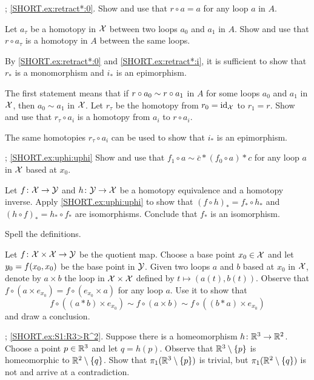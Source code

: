 \parbf{\ref{ex:retract*}}; \ref{SHORT.ex:retract*:0}.
Show and use that $r\circ a=a$ for any loop $a$ in $A$.

 Let $a_\tau$ be a homotopy in $\mathcal{X}$ between two loops $a_0$ and $a_1$ in $A$.
Show and use that $r\circ a_\tau$ is a homotopy in $A$ between the same loops.

By \ref{SHORT.ex:retract*:0} and \ref{SHORT.ex:retract*:i}, it is sufficient to show that $r_*$ is a monomorphism and $i_*$ is an epimorphism.

The first statement means that if $r\circ a_0\z\sim r\circ a_1$ in $A$ for some loops $a_0$ and $a_1$ in $\mathcal{X}$, then $a_0\sim a_1$ in $\mathcal{X}$.
Let $r_\tau$ be the homotopy from $r_0=\mathrm{id}_{\mathcal{X}}$ to $r_1=r$.
Show and use that $r_\tau\circ a_i$ is a homotopy from
$a_i$ to $r\circ a_i$.

The same homotopies $r_\tau\circ a_i$ can be used to show that $i_*$ is an epimorphism.

\parbf{\ref{ex:uphi}}; \ref{SHORT.ex:uphi:uphi} Show and use that
$f_1\circ a\sim \bar c*(f_0\circ a)*c$ for any loop $a$ in $\mathcal{X}$ based at $x_0$.

Let $f\:\c{X}\z\to\c{Y}$ and $h\:\c{Y}\z\to\c{X}$ be a homotopy equivalence and a homotopy inverse.
Apply \ref{SHORT.ex:uphi:uphi} to show that $(f\circ h)_*=f_*\circ h_*$ and $(h\circ f)_*=h_*\circ f_*$ are isomorphisms.
Conclude that $f_*$ is an isomorphism.

 Spell the definitions.

Let $f\colon\mathcal{X}\times\mathcal{X}\to \mathcal{Y}$ be the quotient map.
Choose a base point $x_0\in\mathcal{X}$ and let $y_0\z= f(x_0,x_0)$ be the base point in $\mathcal{Y}$.
Given two loops $a$ and $b$ based at $x_0$ in $\mathcal{X}$, denote by $a\times b$ the loop in $\mathcal{X}\times \mathcal{X}$ defined by $t\mapsto (a(t),b(t))$.
Observe that $f\circ (a\times e_{x_0})= f\circ (e_{x_0}\times a)$ for any loop $a$.
Use it to show that
\[f\circ((a*b)\times e_{x_0})\sim f\circ(a\times b)\sim f\circ((b*a)\times e_{x_0})\]
and draw a conclusion.

\parbf{\ref{ex:S1}}; \ref{SHORT.ex:S1:R3>R^2}.
Suppose there is a homeomorphism $h\colon\mathbb{R}^3\to\mathbb{R}^2$.
Choose a point $p\in \mathbb{R}^3$ and let $q=h(p)$.
Observe that $\mathbb{R}^3\setminus\{p\}$ is homeomorphic to $\mathbb{R}^2\setminus\{q\}$.
Show that $\pi_1(\mathbb{R}^3\setminus\{p\})$ is trivial, but $\pi_1(\mathbb{R}^2\setminus\{q\})$ is not and arrive at a contradiction.

